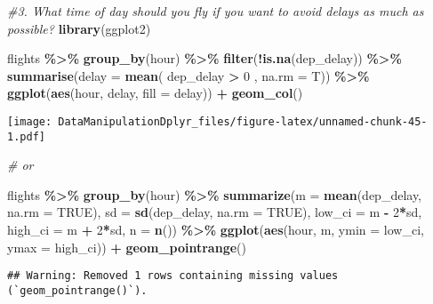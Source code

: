 \documentclass[
]{article}
\newenvironment{Shaded}{\begin{snugshade}}{\end{snugshade}}
\newcommand{\AttributeTok}[1]{\textcolor[rgb]{0.13,0.29,0.53}{#1}}
\newcommand{\CommentTok}[1]{\textcolor[rgb]{0.56,0.35,0.01}{\textit{#1}}}
\newcommand{\ConstantTok}[1]{\textcolor[rgb]{0.56,0.35,0.01}{#1}}
\newcommand{\DecValTok}[1]{\textcolor[rgb]{0.00,0.00,0.81}{#1}}
\newcommand{\FunctionTok}[1]{\textcolor[rgb]{0.13,0.29,0.53}{\textbf{#1}}}
\newcommand{\NormalTok}[1]{#1}
\newcommand{\SpecialCharTok}[1]{\textcolor[rgb]{0.81,0.36,0.00}{\textbf{#1}}}
\begin{document}
\begin{Shaded}
\begin{Highlighting}[]
\CommentTok{\#3. What time of day should you fly if you want to avoid delays as much as possible?}
\FunctionTok{library}\NormalTok{(ggplot2)}

\NormalTok{flights }\SpecialCharTok{\%\textgreater{}\%}
  \FunctionTok{group\_by}\NormalTok{(hour) }\SpecialCharTok{\%\textgreater{}\%}
  \FunctionTok{filter}\NormalTok{(}\SpecialCharTok{!}\FunctionTok{is.na}\NormalTok{(dep\_delay)) }\SpecialCharTok{\%\textgreater{}\%}
  \FunctionTok{summarise}\NormalTok{(}\AttributeTok{delay =} \FunctionTok{mean}\NormalTok{( dep\_delay }\SpecialCharTok{\textgreater{}} \DecValTok{0}\NormalTok{ , }\AttributeTok{na.rm =}\NormalTok{ T)) }\SpecialCharTok{\%\textgreater{}\%}
  \FunctionTok{ggplot}\NormalTok{(}\FunctionTok{aes}\NormalTok{(hour, delay, }\AttributeTok{fill =}\NormalTok{ delay)) }\SpecialCharTok{+} \FunctionTok{geom\_col}\NormalTok{() }
\end{Highlighting}
\end{Shaded}

\texttt{[image: DataManipulationDplyr\_files/figure-latex/unnamed-chunk-45-1.pdf]}

\begin{Shaded}
\begin{Highlighting}[]
\CommentTok{\# or}

\NormalTok{flights }\SpecialCharTok{\%\textgreater{}\%}
  \FunctionTok{group\_by}\NormalTok{(hour) }\SpecialCharTok{\%\textgreater{}\%}
  \FunctionTok{summarize}\NormalTok{(}\AttributeTok{m =} \FunctionTok{mean}\NormalTok{(dep\_delay, }\AttributeTok{na.rm =} \ConstantTok{TRUE}\NormalTok{),}
            \AttributeTok{sd =} \FunctionTok{sd}\NormalTok{(dep\_delay, }\AttributeTok{na.rm =} \ConstantTok{TRUE}\NormalTok{),}
            \AttributeTok{low\_ci =}\NormalTok{ m }\SpecialCharTok{{-}} \DecValTok{2}\SpecialCharTok{*}\NormalTok{sd,}
            \AttributeTok{high\_ci =}\NormalTok{ m }\SpecialCharTok{+} \DecValTok{2}\SpecialCharTok{*}\NormalTok{sd,}
            \AttributeTok{n =} \FunctionTok{n}\NormalTok{()) }\SpecialCharTok{\%\textgreater{}\%}
  \FunctionTok{ggplot}\NormalTok{(}\FunctionTok{aes}\NormalTok{(hour, m, }\AttributeTok{ymin =}\NormalTok{ low\_ci, }\AttributeTok{ymax =}\NormalTok{ high\_ci)) }\SpecialCharTok{+}
  \FunctionTok{geom\_pointrange}\NormalTok{()}
\end{Highlighting}
\end{Shaded}

\begin{verbatim}
## Warning: Removed 1 rows containing missing values (`geom_pointrange()`).
\end{verbatim}
\end{document}
